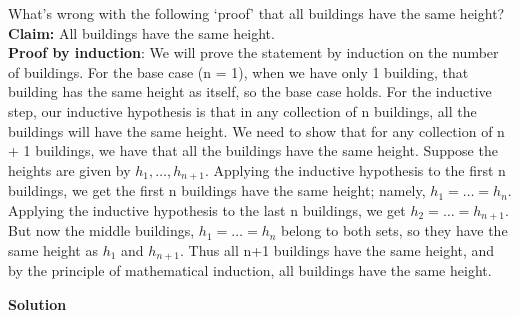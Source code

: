 \documentclass[11pt]{scrartcl}
\theoremstyle{dotlessP}
\theoremstyle{dotlessN}
\begin{document}
\begin{ques}
	What's wrong with the following `proof' that all buildings have the same height? \\
\textbf{Claim:} All buildings have the same height. \\
\textbf{Proof by induction}: We will prove the statement by induction on the number of buildings. For the base case (n = 1), when we have only 1 building, that building has the same height as itself, so the base case holds. For the inductive step, our inductive hypothesis is that in any collection of n buildings, all the buildings will have the same height. We need to show that for any collection of n + 1 buildings, we have that all the buildings have the same height. Suppose the heights are given by $h_1,\dots,h_{n+1}$. Applying the inductive hypothesis to the first n buildings, we get the first n buildings have the same height; namely, $h_1 = \dots = h_n$. Applying the inductive hypothesis to the last n buildings, we get $h_2 = \dots = h_{n+1}$. But now the middle buildings, $h_1 = \dots = h_n$ belong to both sets, so they have the same height as $h_1$ and $h_{n+1}$. Thus all n+1 buildings have the same height, and by the principle of mathematical induction, all buildings have the same height.
\end{ques}
\textbf{Solution}
\end{document}
